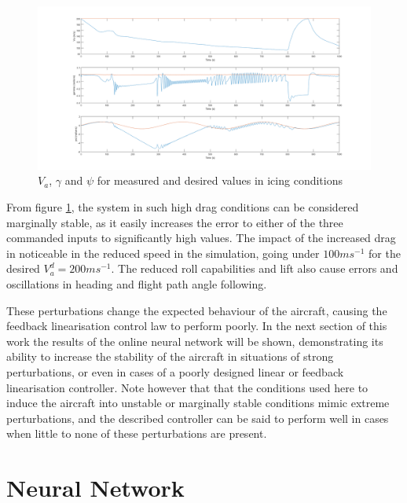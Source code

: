 \begin{figure}[H]
\centering
\includegraphics[width=1\textwidth]{Figures/Results/ref_icing.PNG}
\caption[Reference following in icing conditions]{$V_a$, $\gamma$ and $\psi$ for measured and desired values in icing conditions}
\label{fig:ref_icing}
\end{figure}

From figure \ref{fig:ref_icing}, the system in such high drag conditions can be considered marginally stable, as it easily increases the error to either of the three commanded inputs to significantly high values. The impact of the increased drag in noticeable in the reduced speed in the simulation, going under $100ms^{-1}$ for the desired $V_a^d=200ms^{-1}$. The reduced roll capabilities and lift also cause errors and oscillations in heading and flight path angle following.



These perturbations change the expected behaviour of the aircraft, causing the feedback linearisation control law to perform poorly. In the next section of this work the results of the online neural network will be shown, demonstrating its ability to increase the stability of the aircraft in situations of strong perturbations, or even in cases of a poorly designed linear or feedback linearisation controller. Note however that that the conditions used here to induce the aircraft into unstable or marginally stable conditions mimic extreme perturbations, and the described controller can be said to perform well in cases when little to none of these perturbations are present.


\section{Neural Network}
\label{section:results/NN}


